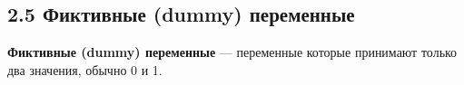 \documentclass[a0,final]{a0poster}
\begin{document}
\begin{multicols}{4}


\subsection*{\textbf{2.5 Фиктивные (dummy) переменные}}
\begin{tcolorbox}[colback=red!5!white,colframe=red!75!black]
\textbf{Фиктивные (dummy) переменные} — переменные которые принимают только два значения, обычно 0 и 1.
\end{tcolorbox}

\end{multicols}
\end{document}
